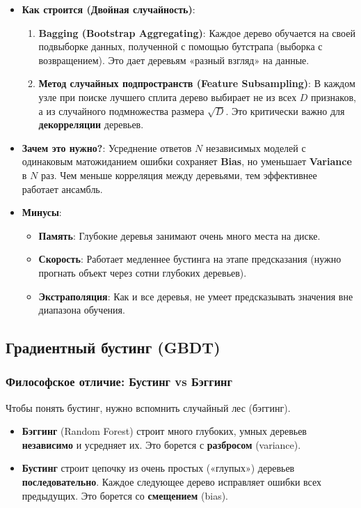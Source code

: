 \documentclass[12pt]{article}
\begin{document}
\begin{itemize}
    \item \textbf{Как строится (Двойная случайность)}:
    \begin{enumerate}
        \item \textbf{Bagging (Bootstrap Aggregating)}: Каждое дерево обучается на своей подвыборке данных, полученной с помощью бутстрапа (выборка с возвращением). Это дает деревьям «разный взгляд» на данные.
        \item \textbf{Метод случайных подпространств (Feature Subsampling)}: В каждом узле при поиске лучшего сплита дерево выбирает не из всех $D$ признаков, а из случайного подмножества размера $\sqrt{D}$. Это критически важно для \textbf{декорреляции} деревьев.
    \end{enumerate}
    
    \item \textbf{Зачем это нужно?}: Усреднение ответов $N$ независимых моделей с одинаковым матожиданием ошибки сохраняет \textbf{Bias}, но уменьшает \textbf{Variance} в $N$ раз. Чем меньше корреляция между деревьями, тем эффективнее работает ансамбль.
    
    \item \textbf{Минусы}:
    \begin{itemize}
        \item \textbf{Память}: Глубокие деревья занимают очень много места на диске.
        \item \textbf{Скорость}: Работает медленнее бустинга на этапе предсказания (нужно прогнать объект через сотни глубоких деревьев).
        \item \textbf{Экстраполяция}: Как и все деревья, не умеет предсказывать значения вне диапазона обучения.
    \end{itemize}
\end{itemize}

\subsection{Градиентный бустинг (GBDT)}

\subsubsection{Философское отличие: Бустинг vs Бэггинг}
Чтобы понять бустинг, нужно вспомнить случайный лес (бэггинг). 
\begin{itemize}
    \item \textbf{Бэггинг} (Random Forest) строит много глубоких, умных деревьев \textbf{независимо} и усредняет их. Это борется с \textbf{разбросом} (variance).
    \item \textbf{Бустинг} строит цепочку из очень простых («глупых») деревьев \textbf{последовательно}. Каждое следующее дерево исправляет ошибки всех предыдущих. Это борется со \textbf{смещением} (bias).
\end{itemize}
\end{document}
